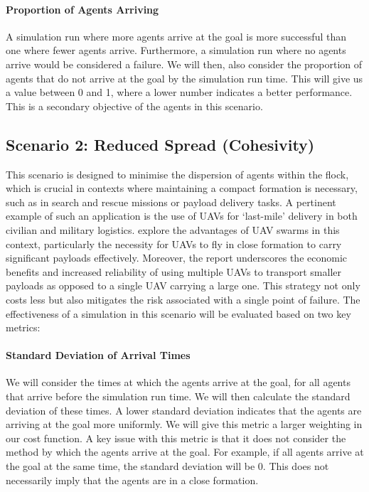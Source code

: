 \documentclass[12pt]{article}
\begin{document}
\paragraph{Proportion of Agents Arriving} A simulation run where more agents arrive at the goal is more successful than one where fewer agents arrive. Furthermore, a simulation run where no agents arrive would be considered a failure. We will then, also consider the proportion of agents that do not arrive at the goal by the simulation run time. This will give us a value between 0 and 1, where a lower number indicates a better performance. This is a secondary objective of the agents in this scenario.

\subsection{Scenario 2: Reduced Spread (Cohesivity)}
This scenario is designed to minimise the dispersion of agents within the flock, which is crucial in contexts where maintaining a compact formation is necessary, such as in search and rescue missions or payload delivery tasks. A pertinent example of such an application is the use of UAVs for `last-mile' delivery in both civilian and military logistics. \citet{thornton2018swarming} explore the advantages of UAV swarms in this context, particularly the necessity for UAVs to fly in close formation to carry significant payloads effectively. Moreover, the report underscores the economic benefits and increased reliability of using multiple UAVs to transport smaller payloads as opposed to a single UAV carrying a large one. This strategy not only costs less but also mitigates the risk associated with a single point of failure. The effectiveness of a simulation in this scenario will be evaluated based on two key metrics:

\paragraph{Standard Deviation of Arrival Times} We will consider the times at which the agents arrive at the goal, for all agents that arrive before the simulation run time. We will then calculate the standard deviation of these times. A lower standard deviation indicates that the agents are arriving at the goal more uniformly. We will give this metric a larger weighting in our cost function. A key issue with this metric is that it does not consider the method by which the agents arrive at the goal. For example, if all agents arrive at the goal at the same time, the standard deviation will be 0. This does not necessarily imply that the agents are in a close formation.
\end{document}
